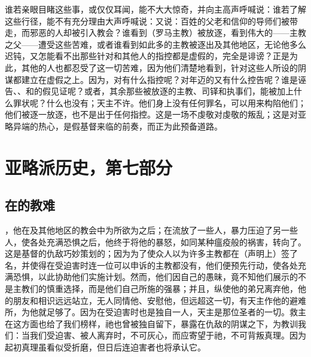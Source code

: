 谁若亲眼目睹这些事，或仅仅耳闻，能不大大惊奇，并向主高声呼喊说：谁若了解这些行径，能不有充分理由大声呼喊说：又说：百姓的父老和信仰的导师们被带走，而邪恶的人却被引入教会？谁看到（罗马主教）被放逐，看到伟大的——主教之父——遭受这些苦难，或者谁看到如此多的主教被逐出及其他地区，无论他多么迟钝，又怎能看不出那些针对和其他人的指控都是虚假的，完全是诽谤？正是为此，其他的人也都忍受了这一切苦难，因为他们清楚地看到，针对这些人所设的阴谋都建立在虚假之上。因为，对有什么指控呢？对年迈的又有什么控告呢？谁是诬告、、和的假见证呢？或者，其余那些被放逐的主教、司铎和执事们，能被加上什么罪状呢？什么也没有；天主不许。他们身上没有任何罪名，可以用来构陷他们；他们被逐一放逐，也不是出于任何指控。这是一场不虔敬对虔敬的叛乱；这是对亚略异端的热心，是假基督来临的前奏，而正为此预备道路。\par



\section{亚略派历史，第七部分}

\par


\subsection{在的教难}

，他在及其他地区的教会中为所欲为之后；在流放了一些人，暴力压迫了另一些人，使各处充满恐惧之后，他终于将他的暴怒，如同某种瘟疫般的祸害，转向了。这是基督的仇敌巧妙策划的；因为为了使众人以为许多主教都在（声明上）签了名，并使得在受迫害时连一位可以申诉的主教都没有，他们便预先行动，使各处充满恐惧，以此协助他们实施计划。然而，他们因自己的愚昧，竟不知他们展示的不是主教们的慎重选择，而是他们自己所施的强暴；并且，纵使他的弟兄离弃他，他的朋友和相识远远站立，无人同情他、安慰他，但远超这一切，有天主作他的避难所，为他就足够了。因为在受迫害时也是独自一人，天主是那位圣者的一切。救主在这方面也给了我们榜样，祂也曾被独自留下，暴露在仇敌的阴谋之下，为教训我们：当我们受迫害、被人离弃时，不可灰心，而应寄望于祂，不可背叛真理。因为起初真理虽看似受折磨，但日后连迫害者也将承认它。\par


